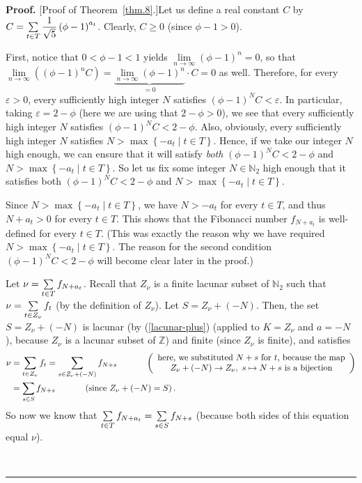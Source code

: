 \documentclass[numbers=enddot,12pt,final,onecolumn,notitlepage]{scrartcl}%
\numberwithin{exer}{section}
\theoremstyle{definition}
\newenvironment{proof}[1][Proof]{\noindent\textbf{#1.} }{\ \rule{0.5em}{0.5em}}
\let\sumnonlimits\sum
\renewcommand{\sum}{\sumnonlimits\limits}
\begin{document}
\begin{proof}
[Proof of Theorem~\ref{thm.8}.]Let us define a real constant $C$ by
$C=\sum\limits_{t\in T}\dfrac{1}{\sqrt{5}}\left(  \phi-1\right)  ^{a_{t}}$.
Clearly, $C\geq0$ (since $\phi-1>0$).

First, notice that $0<\phi-1<1$ yields $\lim\limits_{n\rightarrow\infty
}\left(  \phi-1\right)  ^{n}=0$, so that $\lim\limits_{n\rightarrow\infty
}\left(  \left(  \phi-1\right)  ^{n}C\right)  =\underbrace{\lim
\limits_{n\rightarrow\infty}\left(  \phi-1\right)  ^{n}}_{=0}\cdot C=0$ as
well. Therefore, for every $\varepsilon>0$, every sufficiently high integer
$N$ satisfies $\left(  \phi-1\right)  ^{N}C<\varepsilon$. In particular,
taking $\varepsilon=2-\phi$ (here we are using that $2-\phi>0$), we see that
every sufficiently high integer $N$ satisfies $\left(  \phi-1\right)
^{N}C<2-\phi$. Also, obviously, every sufficiently high integer $N$ satisfies
$N>\max\left\{  -a_{t}\mid t\in T\right\}  $. Hence, if we take our integer
$N$ high enough, we can ensure that it will satisfy \textit{both} $\left(
\phi-1\right)  ^{N}C<2-\phi$ and $N>\max\left\{  -a_{t}\mid t\in T\right\}  $.
So let us fix some integer $N\in\mathbb{N}_{2}$ high enough that it satisfies
both $\left(  \phi-1\right)  ^{N}C<2-\phi$ and $N>\max\left\{  -a_{t}\mid t\in
T\right\}  $.

Since $N>\max\left\{  -a_{t}\mid t\in T\right\}  $, we have $N>-a_{t}$ for
every $t\in T$, and thus $N+a_{t}>0$ for every $t\in T$. This shows that the
Fibonacci number $f_{N+a_{t}}$ is well-defined for every $t\in T$. (This was
exactly the reason why we have required $N>\max\left\{  -a_{t}\mid t\in
T\right\}  $. The reason for the second condition $\left(  \phi-1\right)
^{N}C<2-\phi$ will become clear later in the proof.)

Let $\nu=\sum\limits_{t\in T}f_{N+a_{t}}$. Recall that $Z_{\nu}$ is a finite
lacunar subset of $\mathbb{N}_{2}$ such that $\nu=\sum\limits_{t\in Z_{\nu}%
}f_{t}$ (by the definition of $Z_{\nu}$). Let $S=Z_{\nu}+\left(  -N\right)  $.
Then, the set $S=Z_{\nu}+\left(  -N\right)  $ is lacunar (by
(\ref{lacunar-plus}) (applied to $K=Z_{\nu}$ and $a=-N$), because $Z_{\nu}$ is
a lacunar subset of $\mathbb{Z}$) and finite (since $Z_{\nu}$ is finite), and
satisfies%
\begin{align*}
\nu &  =\sum\limits_{t\in Z_{\nu}}f_{t}=\sum\limits_{s\in Z_{\nu}+\left(
-N\right)  }f_{N+s}\ \ \ \ \ \ \ \ \ \ \left(
\begin{array}
[c]{c}%
\text{here, we substituted }N+s\text{ for }t\text{, because the map}\\
Z_{\nu}+\left(  -N\right)  \rightarrow Z_{\nu},\text{ }s\mapsto N+s\text{ is a
bijection}%
\end{array}
\right) \\
&  =\sum\limits_{s\in S}f_{N+s}\ \ \ \ \ \ \ \ \ \ \left(  \text{since }%
Z_{\nu}+\left(  -N\right)  =S\right)  .
\end{align*}
So now we know that $\sum\limits_{t\in T}f_{N+a_{t}}=\sum\limits_{s\in
S}f_{N+s}$ (because both sides of this equation equal $\nu$).


\end{proof}
\end{document}
